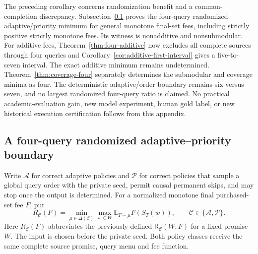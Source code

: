 \documentclass[pdflatex,sn-mathphys-num]{sn-jnl}
\newcommand{\RR}{\mathsf{R}}
\theoremstyle{thmstyleone}
\theoremstyle{thmstylethree}
\theoremstyle{thmstyletwo}
\begin{document}
The preceding corollary concerns randomization benefit and a common-completion discrepancy. Subsection~\ref{app:randomized-adaptive-priority-gap-candidate} proves the four-query randomized adaptive/priority minimum for general monotone final-set fees, including strictly positive strictly monotone fees. Its witness is nonadditive and nonsubmodular. For additive fees, Theorem~\ref{thm:four-additive} now excludes all complete sources through four queries and Corollary~\ref{cor:additive-first-interval} gives a five-to-seven interval. The exact additive minimum remains undetermined. Theorem~\ref{thm:coverage-four} separately determines the submodular and coverage minima as four. The deterministic adaptive/order boundary remains six versus seven, and no largest randomized four-query ratio is claimed. No practical academic-evaluation gain, new model experiment, human gold label, or new historical execution certification follows from this appendix.


\subsection{A four-query randomized adaptive--priority boundary}
\label{app:randomized-adaptive-priority-gap-candidate}

Write $\mathcal A$ for correct adaptive policies and $\mathcal P$ for
correct policies that sample a global query order with the private seed,
permit causal permanent skips, and may stop once the output is determined.
For a normalized monotone final purchased-set fee $F$, put
\[
 R_{\mathcal C}(F)=\min_{\mu\in\Delta(\mathcal C)}
       \max_{w\in W}\mathbb E_{T\sim\mu}F(S_T(w)),
 \qquad \mathcal C\in\{\mathcal A,\mathcal P\}.
\]
Here $R_{\mathcal C}(F)$ abbreviates the previously defined
$\RR_{\mathcal C}(W;F)$ for a fixed promise $W$.
The input is chosen before the private seed. Both policy classes receive
the same complete source promise, query menu and fee function.
\end{document}

